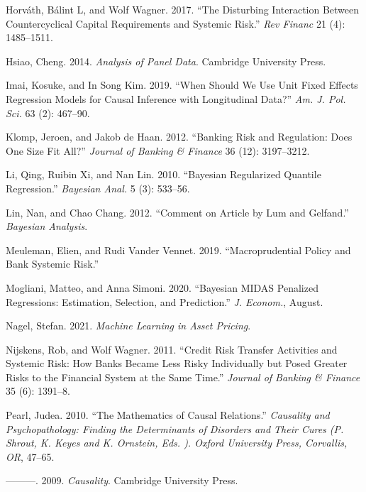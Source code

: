 \documentclass[
  10pt,
]{article}
\begin{document}
\leavevmode\hypertarget{ref-Horvath2017}{}%
Horváth, Bálint L, and Wolf Wagner. 2017. ``The Disturbing Interaction
Between Countercyclical Capital Requirements and Systemic Risk.''
\emph{Rev Financ} 21 (4): 1485--1511.

\leavevmode\hypertarget{ref-Hsiao2014}{}%
Hsiao, Cheng. 2014. \emph{Analysis of Panel Data}. Cambridge University
Press.

\leavevmode\hypertarget{ref-Imai2019}{}%
Imai, Kosuke, and In Song Kim. 2019. ``When Should We Use Unit Fixed
Effects Regression Models for Causal Inference with Longitudinal Data?''
\emph{Am. J. Pol. Sci.} 63 (2): 467--90.

\leavevmode\hypertarget{ref-Klomp2012}{}%
Klomp, Jeroen, and Jakob de Haan. 2012. ``Banking Risk and Regulation:
Does One Size Fit All?'' \emph{Journal of Banking \& Finance} 36 (12):
3197--3212.

\leavevmode\hypertarget{ref-Li2010}{}%
Li, Qing, Ruibin Xi, and Nan Lin. 2010. ``Bayesian Regularized Quantile
Regression.'' \emph{Bayesian Anal.} 5 (3): 533--56.

\leavevmode\hypertarget{ref-Lin2012}{}%
Lin, Nan, and Chao Chang. 2012. ``Comment on Article by Lum and
Gelfand.'' \emph{Bayesian Analysis}.

\leavevmode\hypertarget{ref-Meuleman2019}{}%
Meuleman, Elien, and Rudi Vander Vennet. 2019. ``Macroprudential Policy
and Bank Systemic Risk.''

\leavevmode\hypertarget{ref-Mogliani2020}{}%
Mogliani, Matteo, and Anna Simoni. 2020. ``Bayesian MIDAS Penalized
Regressions: Estimation, Selection, and Prediction.'' \emph{J. Econom.},
August.

\leavevmode\hypertarget{ref-Nagel2021}{}%
Nagel, Stefan. 2021. \emph{Machine Learning in Asset Pricing}.

\leavevmode\hypertarget{ref-Nijskens2011}{}%
Nijskens, Rob, and Wolf Wagner. 2011. ``Credit Risk Transfer Activities
and Systemic Risk: How Banks Became Less Risky Individually but Posed
Greater Risks to the Financial System at the Same Time.'' \emph{Journal
of Banking \& Finance} 35 (6): 1391--8.

\leavevmode\hypertarget{ref-Pearl2010}{}%
Pearl, Judea. 2010. ``The Mathematics of Causal Relations.''
\emph{Causality and Psychopathology: Finding the Determinants of
Disorders and Their Cures (P. Shrout, K. Keyes and K. Ornstein, Eds. ).
Oxford University Press, Corvallis, OR}, 47--65.

\leavevmode\hypertarget{ref-Pearl2009}{}%
---------. 2009. \emph{Causality}. Cambridge University Press.
\end{document}
